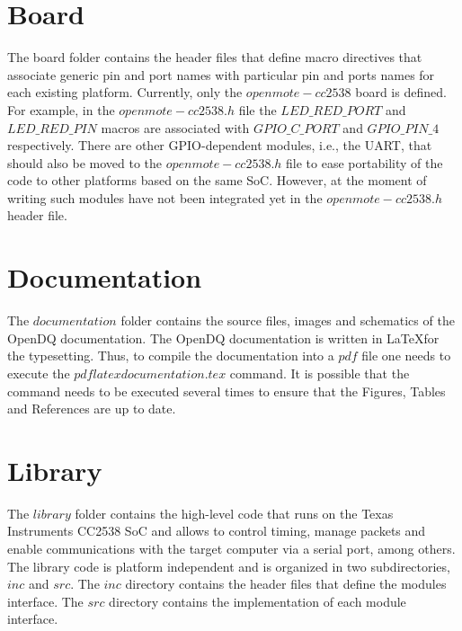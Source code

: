 \label{03-board}
\section{Board}
The board folder contains the header files that define macro directives that associate generic pin and port names with particular pin and ports names for each existing platform. Currently, only the $openmote-cc2538$ board is defined. For example, in the $openmote-cc2538.h$ file the $LED\_RED\_PORT$ and $LED\_RED\_PIN$ macros are associated with $GPIO\_C\_PORT$ and $GPIO\_PIN\_4$ respectively. There are other GPIO-dependent modules, i.e., the UART, that should also be moved to the $openmote-cc2538.h$ file to ease portability of the code to other platforms based on the same SoC. However, at the moment of writing such modules have not been integrated yet in the $openmote-cc2538.h$ header file.

\label{03-documentation}
\section{Documentation}
The $documentation$ folder contains the source files, images and schematics of the OpenDQ documentation. The OpenDQ documentation is written in \LaTeX for the typesetting. Thus, to compile the documentation into a $pdf$ file one needs to execute the $pdflatex documentation.tex$ command. It is possible that the command needs to be executed several times to ensure that the Figures, Tables and References are up to date.

\label{03-library}
\section{Library}
The $library$ folder contains the high-level code that runs on the Texas Instruments CC2538 SoC and allows to control timing, manage packets and enable communications with the target computer via a serial port, among others. The library code is platform independent and is organized in two subdirectories, $inc$ and $src$. The $inc$ directory contains the header files that define the modules interface. The $src$ directory contains the implementation of each module interface.


